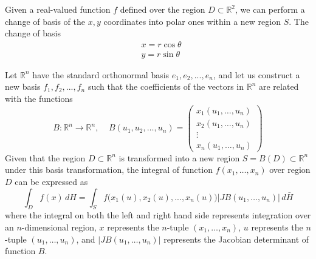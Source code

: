  \begin{example}
  Given a real-valued function $f$ defined over the region $D \subset \mathbb{R}^2$, we can perform a change of basis of the $x, y$ coordinates into polar ones within a new region $S$. The change of basis 
  \begin{align*}
      & x = r \cos{\theta} \\
      & y = r \sin{\theta} 
  \end{align*}
  \begin{center}
  \end{center}
  \end{example}

  \begin{theorem}
  Let $\mathbb{R}^n$ have the standard orthonormal basis $e_1, e_2, ..., e_n$, and let us construct a new basis $f_1, f_2, ..., f_n$ such that the coefficients of the vectors in $\mathbb{R}^n$ are related with the functions
  \[B: \mathbb{R}^n \longrightarrow \mathbb{R}^n, \;\;\;\; B(u_1, u_2, \ldots, u_n) = \begin{pmatrix}
  x_1 (u_1, \ldots, u_n) \\x_2 (u_1, \ldots, u_n) \\ \vdots \\ x_n (u_1, \ldots, u_n)
  \end{pmatrix}\]
  Given that the region $D \subset \mathbb{R}^n$ is transformed into a new region $S = B(D) \subset \mathbb{R}^n$ under this basis transformation, the integral of function $f(x_1, \ldots, x_n)$ over region $D$ can be expressed as 
  \[\int_D f(x) \, dH = \int_S f \big( x_1(u), x_2(u), ..., x_n (u) \big) \big| J B(u_1, \ldots, u_n)\big| \, d \bar{H}\]
  where the integral on both the left and right hand side represents integration over an $n$-dimensional region, $x$ represents the $n$-tuple $(x_1, \ldots, x_n)$, $u$ represents the $n$-tuple $(u_1, \ldots, u_n)$, and $\big| J B(u_1, \ldots, u_n)\big|$ represents the Jacobian determinant of function $B$. 
  \end{theorem}

